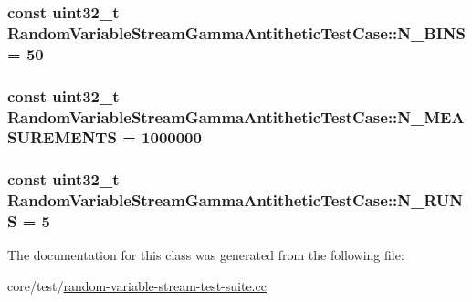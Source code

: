 \subsubsection[{\texorpdfstring{N\+\_\+\+B\+I\+NS}{N_BINS}}]{\setlength{\rightskip}{0pt plus 5cm}const uint32\+\_\+t Random\+Variable\+Stream\+Gamma\+Antithetic\+Test\+Case\+::\+N\+\_\+\+B\+I\+NS = 50\hspace{0.3cm}{\ttfamily [static]}}\hypertarget{classRandomVariableStreamGammaAntitheticTestCase_a53782cd4dda85815c519f356800b2193}{}\label{classRandomVariableStreamGammaAntitheticTestCase_a53782cd4dda85815c519f356800b2193}
\subsubsection[{\texorpdfstring{N\+\_\+\+M\+E\+A\+S\+U\+R\+E\+M\+E\+N\+TS}{N_MEASUREMENTS}}]{\setlength{\rightskip}{0pt plus 5cm}const uint32\+\_\+t Random\+Variable\+Stream\+Gamma\+Antithetic\+Test\+Case\+::\+N\+\_\+\+M\+E\+A\+S\+U\+R\+E\+M\+E\+N\+TS = 1000000\hspace{0.3cm}{\ttfamily [static]}}\hypertarget{classRandomVariableStreamGammaAntitheticTestCase_a0b59ae69267b6ca3649f0617cf02932e}{}\label{classRandomVariableStreamGammaAntitheticTestCase_a0b59ae69267b6ca3649f0617cf02932e}
\subsubsection[{\texorpdfstring{N\+\_\+\+R\+U\+NS}{N_RUNS}}]{\setlength{\rightskip}{0pt plus 5cm}const uint32\+\_\+t Random\+Variable\+Stream\+Gamma\+Antithetic\+Test\+Case\+::\+N\+\_\+\+R\+U\+NS = 5\hspace{0.3cm}{\ttfamily [static]}}\hypertarget{classRandomVariableStreamGammaAntitheticTestCase_aab2dfb293b0566a23871559a28617bab}{}\label{classRandomVariableStreamGammaAntitheticTestCase_aab2dfb293b0566a23871559a28617bab}


The documentation for this class was generated from the following file\+:\begin{DoxyCompactItemize}
\item 
core/test/\hyperlink{random-variable-stream-test-suite_8cc}{random-\/variable-\/stream-\/test-\/suite.\+cc}\end{DoxyCompactItemize}
